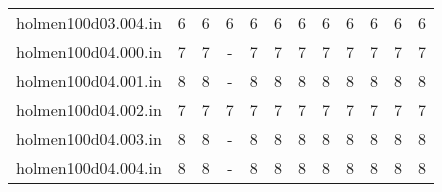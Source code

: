 \documentclass[landscape, 12pt]{report}
\begin{document}
\begin{tabular}{|c|c|c|c|c|c|c|c|c|c|c|c|}
\\
holmen100d03.004.in &    6 &    6 &    6 &    6 &    6 &    6 &    6 &    6 &    6 &    6 &    6
\\
holmen100d04.000.in &    7 &    7 &    - &    7 &    7 &    7 &    7 &    7 &    7 &    7 &    7
\\
holmen100d04.001.in &    8 &    8 &    - &    8 &    8 &    8 &    8 &    8 &    8 &    8 &    8
\\
holmen100d04.002.in &    7 &    7 &    7 &    7 &    7 &    7 &    7 &    7 &    7 &    7 &    7
\\
holmen100d04.003.in &    8 &    8 &    - &    8 &    8 &    8 &    8 &    8 &    8 &    8 &    8
\\
holmen100d04.004.in &    8 &    8 &    - &    8 &    8 &    8 &    8 &    8 &    8 &    8 &    8
\\
\hline 
 \end{tabular}

\clearpage
\end{document}
